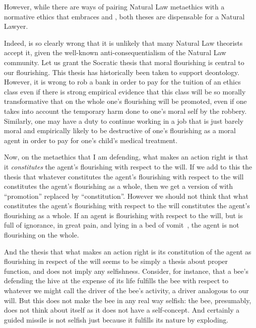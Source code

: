 However, while there are ways of pairing Natural Law metaethics with a normative ethics
that embraces  and , both theses are dispensable for a Natural Lawyer. 

Indeed,  is so clearly wrong that it is unlikely that many Natural Law theorists accept it, given the 
well-known anti-consequentialism of the Natural Law community. Let us grant the Socratic thesis that moral flourishing 
is central to our flourishing. This thesis has historically been taken to support deontology. However, it is wrong
to rob a bank in order to pay for the tuition of an ethics class even if there is strong empirical evidence that this 
class will be so morally transformative that on the whole one's flourishing will be promoted, even if one takes into account the
temporary harm done to one's moral self by the robbery. Similarly, one may have a duty to continue working in a job that is just barely
moral and empirically likely to be destructive of one's flourishing as a moral agent in order to pay for one's
child's medical treatment. 

Now, on the metaethics that I am defending, what makes an action right is that it \textit{constitutes} the agent's 
flourishing with respect to the will. If we add to this the thesis that whatever constitutes the agent's flourishing
with respect to the will constitutes the agent's flourishing as a whole, then we get a version of 
with ``promotion'' replaced by ``constitution''. However we should not think that what constitutes the agent's
flourishing with respect to the will constitutes the agent's flourishing as a whole. If an agent is flourishing with
respect to the will, but is full of ignorance, in great pain, and lying in a bed of vomit~, the agent
is not flourishing on the whole. 

And the thesis that what makes an action right is its constitution of the agent as flourishing in respect of the will
seems to be simply a thesis about proper function, and does not imply any selfishness. Consider, for instance, that a 
bee's defending the hive at the expense of its life fulfills the bee with respect to whatever we might call the driver of 
the bee's activity, a driver analogous to our will. But this does not make the bee in any real way selfish: the bee,
presumably, does not think about itself as it does not have a self-concept. 
And certainly a guided missile is not selfish just because it fulfills its nature by exploding.

